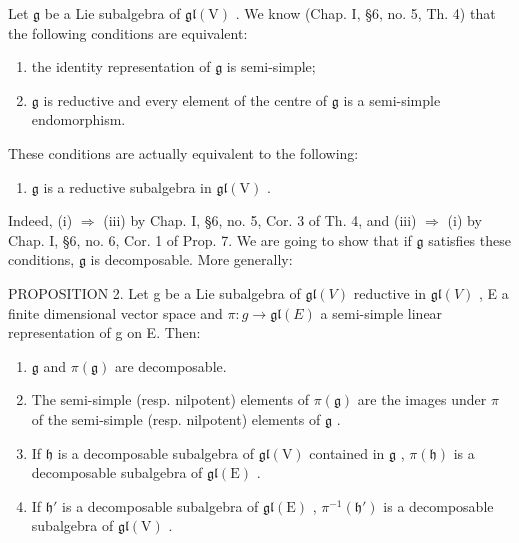 Let \(\mathfrak{g}\) be a Lie subalgebra of \(\mathfrak{gl}(\mathrm{V})\) . We know (Chap. I, §6, no. 5, Th. 4) that the following conditions are equivalent:

\begin{enumerate}
\def\labelenumi{(\roman{enumi})}
\item
  the identity representation of \(\mathfrak{g}\) is semi-simple;
\item
  \(\mathfrak{g}\) is reductive and every element of the centre of \(\mathfrak{g}\) is a semi-simple endomorphism.
\end{enumerate}

These conditions are actually equivalent to the following:

\begin{enumerate}
\def\labelenumi{(\roman{enumi})}
\setcounter{enumi}{2}
\tightlist
\item
  \(\mathfrak{g}\) is a reductive subalgebra in \(\mathfrak{gl}(\mathrm{V})\) .
\end{enumerate}

Indeed, (i) \(\Longrightarrow\) (iii) by Chap. I, §6, no. 5, Cor. 3 of Th. 4, and (iii) \(\Longrightarrow\) (i) by Chap. I, §6, no. 6, Cor. 1 of Prop. 7. We are going to show that if \(\mathfrak{g}\) satisfies these conditions, \(\mathfrak{g}\) is decomposable. More generally:

PROPOSITION 2. Let g be a Lie subalgebra of \(\mathfrak{gl}(V)\) reductive in \(\mathfrak{gl}(V)\) , E a finite dimensional vector space and \(\pi : g \to \mathfrak{gl}(E)\) a semi-simple linear representation of g on E. Then:

\begin{enumerate}
\def\labelenumi{(\roman{enumi})}
\item
  \(\mathfrak{g}\) and \(\pi (\mathfrak{g})\) are decomposable.
\item
  The semi-simple (resp. nilpotent) elements of \(\pi(\mathfrak{g})\) are the images under \(\pi\) of the semi-simple (resp. nilpotent) elements of \(\mathfrak{g}\) .
\item
  If \(\mathfrak{h}\) is a decomposable subalgebra of \(\mathfrak{gl}(\mathrm{V})\) contained in \(\mathfrak{g}\) , \(\pi(\mathfrak{h})\) is a decomposable subalgebra of \(\mathfrak{gl}(\mathrm{E})\) .
\item
  If \(\mathfrak{h}'\) is a decomposable subalgebra of \(\mathfrak{gl}(\mathrm{E})\) , \(\pi^{-1}(\mathfrak{h}')\) is a decomposable subalgebra of \(\mathfrak{gl}(\mathrm{V})\) .
\end{enumerate}

